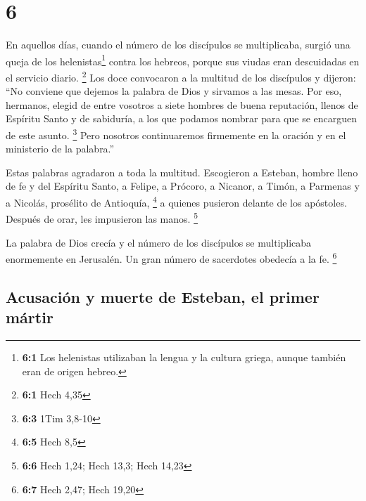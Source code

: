 \hypertarget{section-5}{%
\section{6}\label{section-5}}

 En aquellos días, cuando el número de los discípulos se
multiplicaba, surgió una queja de los helenistas\footnote{\textbf{6:1}
  Los helenistas utilizaban la lengua y la cultura griega, aunque
  también eran de origen hebreo.} contra los hebreos, porque sus viudas
eran descuidadas en el servicio diario. \footnote{\textbf{6:1} Hech 4,35}
 Los doce convocaron a la multitud de los discípulos y
dijeron: ``No conviene que dejemos la palabra de Dios y sirvamos a las
mesas.  Por eso, hermanos, elegid de entre vosotros a
siete hombres de buena reputación, llenos de Espíritu Santo y de
sabiduría, a los que podamos nombrar para que se encarguen de este
asunto. \footnote{\textbf{6:3} 1Tim 3,8-10}  Pero nosotros
continuaremos firmemente en la oración y en el ministerio de la
palabra.''

 Estas palabras agradaron a toda la multitud. Escogieron a
Esteban, hombre lleno de fe y del Espíritu Santo, a Felipe, a Prócoro, a
Nicanor, a Timón, a Parmenas y a Nicolás, prosélito de Antioquía,
\footnote{\textbf{6:5} Hech 8,5}  a quienes pusieron
delante de los apóstoles. Después de orar, les impusieron las manos.
\footnote{\textbf{6:6} Hech 1,24; Hech 13,3; Hech 14,23}

 La palabra de Dios crecía y el número de los discípulos
se multiplicaba enormemente en Jerusalén. Un gran número de sacerdotes
obedecía a la fe. \footnote{\textbf{6:7} Hech 2,47; Hech 19,20}

\hypertarget{acusaciuxf3n-y-muerte-de-esteban-el-primer-muxe1rtir}{%
\subsection{Acusación y muerte de Esteban, el primer
mártir}\label{acusaciuxf3n-y-muerte-de-esteban-el-primer-muxe1rtir}}


